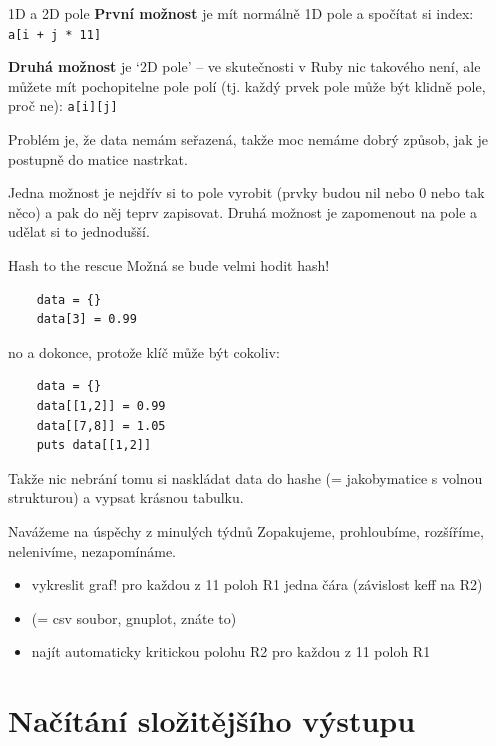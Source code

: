 \documentclass{beamer}
\begin{document}
\begin{frame}[fragile]{1D a 2D pole}
  \textbf{První možnost} je mít normálně 1D pole a spočítat si index:\\
  \texttt{a[i + j * 11]}
  \pause


  \textbf{Druhá možnost} je `2D pole' -- ve skutečnosti v Ruby nic takového není, ale můžete mít pochopitelne pole polí (tj. každý prvek pole může být klidně pole, proč ne):
  \texttt{a[i][j]}
  \pause

  Problém je, že data nemám seřazená, takže moc nemáme dobrý způsob, jak je postupně do matice nastrkat.

  Jedna možnost je nejdřív si to pole vyrobit (prvky budou nil nebo 0 nebo tak něco) a pak do něj teprv zapisovat.
  Druhá možnost je zapomenout na pole a udělat si to jednodušší.
\end{frame}

\begin{frame}[fragile]{Hash to the rescue}
  Možná se bude velmi hodit hash!
  {\scriptsize
  \begin{verbatim}
    data = {}
    data[3] = 0.99
  \end{verbatim}
  }
  \pause
  no a dokonce, protože klíč může být cokoliv:
  {\scriptsize
  \begin{verbatim}
    data = {}
    data[[1,2]] = 0.99
    data[[7,8]] = 1.05
    puts data[[1,2]]
  \end{verbatim}
  }
  Takže nic nebrání tomu si naskládat data do hashe (= jakobymatice s volnou strukturou) a vypsat krásnou tabulku.
\end{frame}

\begin{frame}{Navážeme na úspěchy z minulých týdnů}
  Zopakujeme, prohloubíme, rozšíříme, nelenivíme, nezapomínáme.
  \begin{itemize}
    \item vykreslit graf! pro každou z 11 poloh R1 jedna čára (závislost keff na R2)
    \item (= csv soubor, gnuplot, znáte to)
    \item najít automaticky kritickou polohu R2 pro každou z 11 poloh R1
  \end{itemize}
\end{frame}


\section{Načítání složitějšího výstupu}
\end{document}
